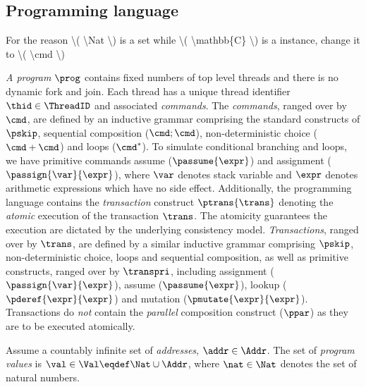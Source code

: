 \subsection{Programming language}

\ac{For the reason \( \Nat \) is a set while \( \mathbb{C} \)  is a instance, change it to \( \cmd \) }

\emph{A program} \( \prog \) contains fixed numbers of top level threads and there is no dynamic fork and join.
Each thread has a unique thread identifier \( \thid \in \ThreadID \) and associated \emph{commands}.
The \emph{commands}, ranged over by $\cmd$, are defined by an inductive grammar comprising the standard constructs of $\pskip$, sequential composition ($\cmd; \cmd$), non-deterministic choice ($\cmd+\cmd$) and loops ($\cmd^*$).
To simulate conditional branching and loops, we have primitive commands assume (\( \passume{\expr}\)) and assignment (\( \passign{\var}{\expr} \)), where \( \var \) denotes stack variable and \( \expr \) denotes arithmetic expressions which have no side effect.
Additionally, the programming language contains the \emph{transaction} construct $\ptrans{\trans}$ denoting the \emph{atomic} execution of the transaction $\trans$. 
The atomicity guarantees the execution are dictated by the underlying consistency model.
\emph{Transactions}, ranged over by $\trans$, are defined by a similar inductive grammar comprising $\pskip$, non-deterministic choice, loops and sequential composition, as well as primitive constructs, ranged over by \( \transpri \), including assignment (\( \passign{\var}{\expr}\)), assume (\( \passume{\expr}\)), lookup (\( \pderef{\expr}{\expr}\)) and mutation (\( \pmutate{\expr}{\expr}\)). 
Transactions do \emph{not} contain the \emph{parallel} composition construct ($\ppar$) as they are to be executed atomically.

\begin{defn}
\label{def:program_values}
Assume a countably infinite set of \emph{addresses}, $\addr \in \Addr$. The set of \emph{program values} is $\val \in \Val \eqdef \Nat \cup \Addr$, where $ \nat \in \Nat$ denotes the set of natural numbers.
\end{defn}

